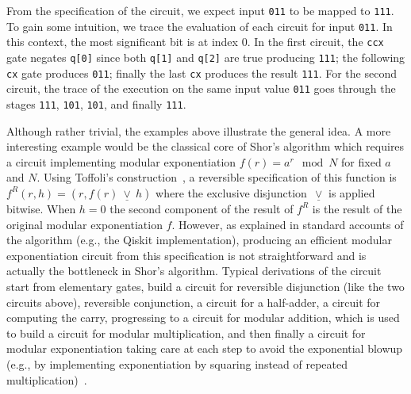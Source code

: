 From the specification of the circuit, we expect input \verb|011| to be mapped
to \verb|111|. To gain some intuition, we trace the evaluation of each circuit for
input \verb|011|. In this context, the most significant bit is at index 0. In
the first circuit, the \verb|ccx| gate negates \verb|q[0]| since both \verb|q[1]| and
\verb|q[2]| are true producing \verb|111|; the following \verb|cx| gate produces
\verb|011|; finally the last \verb|cx| produces the result \verb|111|. For the
second circuit, the trace of the execution on the same input value \verb|011| goes through the stages \verb|111|, \verb|101|, \verb|101|, and finally \verb|111|.

Although rather trivial, the examples above illustrate the general idea. A more
interesting example would be the classical core of Shor's algorithm which
requires a circuit implementing modular exponentiation $f(r) = a^{r} \mod N$ for
fixed $a$ and $N$. Using Toffoli's construction~\citeyearpar{Toffoli:1980}, a
reversible specification of this function is $f^R(r,h) = (r, f(r)
~\underline{\vee}~ h)$ where the exclusive disjunction~$\underline{\vee}$ is
applied bitwise. When $h=0$ the second component of the result of $f^R$ is the
result of the original modular exponentiation $f$.
However, as explained in standard accounts of the algorithm (e.g., the
Qiskit implementation), producing an efficient modular exponentiation circuit
from this specification is not straightforward and is actually the bottleneck in
Shor’s algorithm. Typical derivations of the circuit start from elementary
gates, build a circuit for reversible disjunction (like the two circuits above),
reversible conjunction, a circuit for a half-adder, a circuit for computing the
carry, progressing to a circuit for modular addition, which is used to build a
circuit for modular multiplication, and then finally a circuit for modular
exponentiation taking care at each step to avoid the exponential blowup (e.g.,
by implementing exponentiation by squaring instead of repeated
multiplication)~\cite{shorefficient}.

